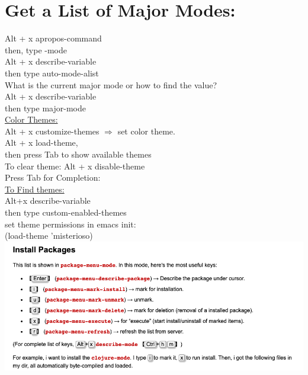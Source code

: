 \documentclass{article}
\begin{document}
\section{Get a List of Major Modes:}
Alt + x apropos-command 
\\
then, type -mode
\\
Alt + x describe-variable
\\
then type auto-mode-alist
\\
What is the current major mode or how to find the value?
\\
Alt + x describe-variable
\\
then type major-mode
\\
\underline{Color Themes:}
\\
Alt + x customize-themes $\Rightarrow$ set color theme.
\\
Alt + x load-theme,
\\
then press Tab to show available themes
\\
To clear theme: Alt + x disable-theme
\\
Press Tab for Completion:
\\
\underline{To Find themes:}
\\
Alt+x describe-variable
\\
then type custom-enabled-themes
\\
set theme permissions in emacs init:
\\
(load-theme 'misterioso)
\\
\includegraphics[width=\linewidth]{installpackages.png}
\end{document}
